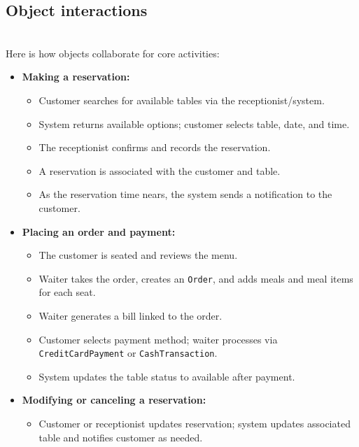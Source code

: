 \subsection{Object interactions}\label{Zszul41maBIIbN2H4PXva}
\\
Here is how objects collaborate for core activities:

\begin{itemize}
\item
\protect{}\label{DAGkXdruCfd4QmkGu-F97}
\textbf{Making a reservation:}

\begin{itemize}
\item
Customer searches for available tables via the receptionist/system.
\item
System returns available options; customer selects table, date, and time.
\item
The receptionist confirms and records the reservation.
\item
A reservation is associated with the customer and table.
\item
As the reservation time nears, the system sends a notification to the customer.
\end{itemize}
\item
\protect{}\label{l-mGF06fXBgcmJC3OoUDC}
\textbf{Placing an order and payment:}

\begin{itemize}
\item
The customer is seated and reviews the menu.
\item
Waiter takes the order, creates an \texttt{Order}, and adds meals and meal items for each seat.
\item
Waiter generates a bill linked to the order.
\item
Customer selects payment method; waiter processes via \texttt{CreditCardPayment} or \texttt{CashTransaction}.
\item
System updates the table status to available after payment.
\end{itemize}
\item
\protect{}\label{d-GXevFAVGsP13BH2aCwZ}
\textbf{Modifying or canceling a reservation:}

\begin{itemize}
\item
Customer or receptionist updates reservation; system updates associated table and notifies customer as needed.
\end{itemize}
\end{itemize}

